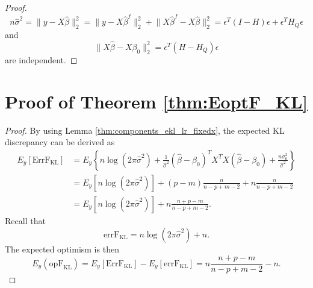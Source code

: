 \begin{proof}
\begin{equation*}
n\hat{\sigma}^2 = \lVert y-X\hat{\beta} \rVert_2^2 = \lVert y-X\hat{\beta}^f \rVert_2^2 + \lVert X\hat{\beta}^f - X\hat{\beta} \rVert_2^2 = \epsilon^T (I-H) \epsilon + \epsilon^T H_Q \epsilon
\end{equation*}
and
\begin{equation*}
\lVert X\hat{\beta} - X\beta_0 \rVert_2^2 = \epsilon^T (H-H_Q) \epsilon
\end{equation*}
are independent.
\end{proof}


\section{Proof of Theorem \ref{thm:EoptF_KL}}
\begin{proof}
By using Lemma \ref{thm:components_ekl_lr_fixedx}, the expected KL discrepancy can be derived as
\begin{equation*}
\begin{aligned}
E_y [\text{ErrF}_\text{KL} ] 
&= E_y \left\{ n \log (2\pi \hat\sigma^2) + \frac{1}{\hat\sigma^2}  (\hat\beta-\beta_0)^T X^T X (\hat\beta-\beta_0) + \frac{n\sigma_0^2}{\hat\sigma^2} \right\} \\
&= E_y \left [ n\log (2\pi \hat \sigma^2)\right ] +  (p-m) \frac{n}{n-p+m-2} + n \frac{n}{n-p+m-2}\\
&= E_y \left [ n\log (2\pi \hat \sigma^2) \right ] +  n \frac{n+p-m}{n-p+m-2}.
\end{aligned}
\end{equation*}
Recall that
\begin{equation*}
\text{errF}_\text{KL} = n\log(2\pi \hat\sigma^2) + n.
\end{equation*}
The expected optimism is then
\begin{equation*}
E_y(\text{opF}_\text{KL}) = E_y[\text{ErrF}_\text{KL} ]  -  E_y[\text{errF}_\text{KL} ] = n \frac{n+p-m}{n-p+m-2} - n.
\end{equation*}
\end{proof}


